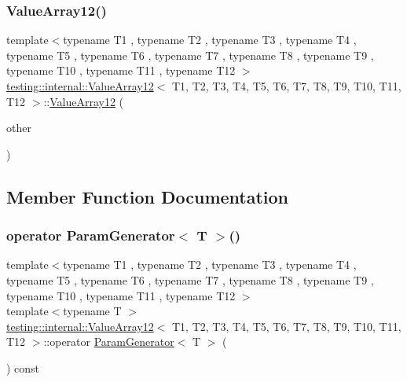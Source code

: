 \subsubsection{\texorpdfstring{ValueArray12()}{ValueArray12()}\hspace{0.1cm}{\footnotesize\ttfamily [2/2]}}
{\footnotesize\ttfamily template$<$typename T1 , typename T2 , typename T3 , typename T4 , typename T5 , typename T6 , typename T7 , typename T8 , typename T9 , typename T10 , typename T11 , typename T12 $>$ \\
\mbox{\hyperlink{classtesting_1_1internal_1_1_value_array12}{testing\+::internal\+::\+Value\+Array12}}$<$ T1, T2, T3, T4, T5, T6, T7, T8, T9, T10, T11, T12 $>$\+::\mbox{\hyperlink{classtesting_1_1internal_1_1_value_array12}{Value\+Array12}} (\begin{DoxyParamCaption}\item[{const \mbox{\hyperlink{classtesting_1_1internal_1_1_value_array12}{Value\+Array12}}$<$ T1, T2, T3, T4, T5, T6, T7, T8, T9, T10, T11, T12 $>$ \&}]{other }\end{DoxyParamCaption})\hspace{0.3cm}{\ttfamily [inline]}}



\subsection{Member Function Documentation}
\mbox{\label{classtesting_1_1internal_1_1_value_array12_acc840a1c32a10ce160731d66c8105e0b}} 
\subsubsection{\texorpdfstring{operator ParamGenerator$<$ T $>$()}{operator ParamGenerator< T >()}}
{\footnotesize\ttfamily template$<$typename T1 , typename T2 , typename T3 , typename T4 , typename T5 , typename T6 , typename T7 , typename T8 , typename T9 , typename T10 , typename T11 , typename T12 $>$ \\
template$<$typename T $>$ \\
\mbox{\hyperlink{classtesting_1_1internal_1_1_value_array12}{testing\+::internal\+::\+Value\+Array12}}$<$ T1, T2, T3, T4, T5, T6, T7, T8, T9, T10, T11, T12 $>$\+::operator \mbox{\hyperlink{classtesting_1_1internal_1_1_param_generator}{Param\+Generator}}$<$ T $>$ (\begin{DoxyParamCaption}{ }\end{DoxyParamCaption}) const\hspace{0.3cm}{\ttfamily [inline]}}


